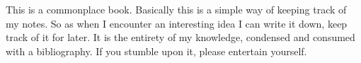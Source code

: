 \documentclass[../book.tex]{subfiles}
\begin{document}
This is a commonplace book. Basically this is a simple way of keeping track of my notes. So as when I encounter an interesting idea I can write it down, keep track of it for later. It is the entirety of my knowledge, condensed and consumed with a bibliography. If you stumble upon it, please entertain yourself. 
\end{document}
